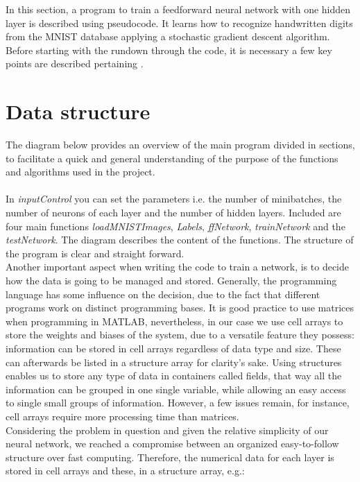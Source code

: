 In this section, a program to train a feedforward neural network with one hidden layer is described using pseudocode. It learns how to recognize handwritten digits from the MNIST database applying a stochastic gradient descent algorithm. Before starting with the rundown through the code, it is necessary a few key points are described pertaining  .

\section{Data structure}\label{DataStruct}
 The diagram below provides an overview of the main program divided in sections, to facilitate a quick and general understanding of the purpose of the functions and algorithms used in the project.\\
 \\
 
 In \textit{inputControl} you can set the parameters i.e. the number of minibatches, the number of neurons of each layer and the number of hidden layers. Included are four main functions \textit{loadMNISTImages}, \textit{Labels}, \textit{ffNetwork}, \textit{ trainNetwork} and the \textit{testNetwork}. The diagram describes the content of the functions. The structure of the program is clear and straight forward.\\
 
 Another important aspect when writing the code to train a network, is to decide how the data is going to be managed and stored. Generally, the programming language has some influence on the decision, due to the fact that different programs work on distinct programming bases. It is good practice to use matrices when programming in MATLAB, nevertheless, in our case we use cell arrays to store the weights and biases of the system, due to a versatile feature they possess: information can be stored in cell arrays regardless of data type and size. These can afterwards be listed in a structure array for clarity's sake. Using structures enables us to store any type of data in containers called fields, that way all the information can be grouped in one single variable, while allowing an easy access to single small groups of information. However, a few issues remain, for instance, cell arrays require more processing time than matrices.\\
 Considering the problem in question and given the relative simplicity of our neural network, we reached a compromise between an organized easy-to-follow structure over fast computing. Therefore, the numerical data for each layer is stored in cell arrays and these, in a structure array, e.g.:
 
